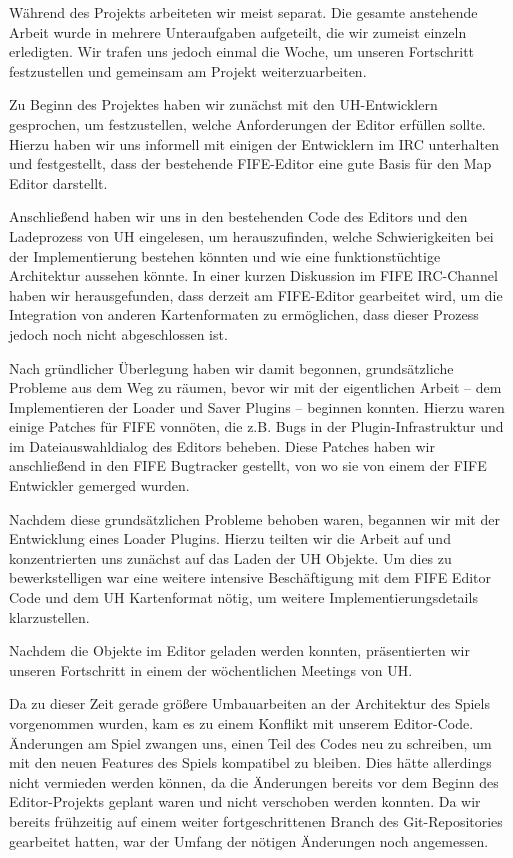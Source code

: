 Während des Projekts arbeiteten wir meist separat. Die gesamte anstehende
Arbeit wurde in mehrere Unteraufgaben aufgeteilt, die wir zumeist einzeln
erledigten. Wir trafen uns jedoch einmal die Woche, um unseren Fortschritt festzustellen
und gemeinsam am Projekt weiterzuarbeiten.


Zu Beginn des Projektes haben wir zunächst mit den UH-Entwicklern gesprochen,
um festzustellen, welche Anforderungen der Editor erfüllen sollte. Hierzu
haben wir uns informell mit einigen der Entwicklern im IRC unterhalten und
festgestellt, dass der bestehende FIFE-Editor eine gute Basis für den Map
Editor darstellt.

Anschließend haben wir uns in den bestehenden Code des Editors und den Ladeprozess
von UH eingelesen, um herauszufinden, welche Schwierigkeiten bei der Implementierung
bestehen könnten und wie eine funktionstüchtige Architektur aussehen könnte.
In einer kurzen Diskussion im FIFE IRC-Channel haben wir herausgefunden, dass
derzeit am FIFE-Editor gearbeitet wird, um die Integration von anderen Kartenformaten
zu ermöglichen, dass dieser Prozess jedoch noch nicht abgeschlossen ist.

Nach gründlicher Überlegung haben wir damit begonnen, grundsätzliche Probleme aus
dem Weg zu räumen, bevor wir mit der eigentlichen Arbeit -- dem Implementieren
der Loader und Saver Plugins -- beginnen konnten. Hierzu waren einige Patches für
FIFE vonnöten, die z.B. Bugs in der Plugin-Infrastruktur und im Dateiauswahldialog
des Editors beheben. Diese Patches haben wir anschließend in den FIFE Bugtracker
gestellt, von wo sie von einem der FIFE Entwickler gemerged wurden.

Nachdem diese grundsätzlichen Probleme behoben waren, begannen wir mit der Entwicklung
eines Loader Plugins. Hierzu teilten wir die Arbeit auf und konzentrierten uns zunächst
auf das Laden der UH Objekte. Um dies zu bewerkstelligen war eine weitere intensive Beschäftigung
mit dem FIFE Editor Code und dem UH Kartenformat nötig, um weitere Implementierungsdetails
klarzustellen.

Nachdem die Objekte im Editor geladen werden konnten, präsentierten wir unseren Fortschritt
in einem der wöchentlichen Meetings von UH.

Da zu dieser Zeit gerade größere Umbauarbeiten an der Architektur des Spiels vorgenommen wurden,
kam es zu einem Konflikt mit unserem Editor-Code. Änderungen am Spiel zwangen uns, einen Teil
des Codes neu zu schreiben, um mit den neuen Features des Spiels kompatibel zu bleiben. Dies
hätte allerdings nicht vermieden werden können, da die Änderungen bereits vor dem Beginn des
Editor-Projekts geplant waren und nicht verschoben werden konnten. Da wir bereits frühzeitig
auf einem weiter fortgeschrittenen Branch des Git-Repositories gearbeitet hatten, war der
Umfang der nötigen Änderungen noch angemessen.

